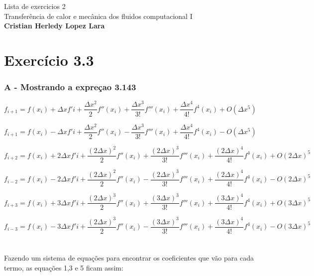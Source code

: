 \documentclass[]{article}
\title{}
\author{}
\begin{document}
\begin{center}
	{\tiny {\normalsize {\large Lista de exercicios 2 \\
Transferência de calor e mecânica dos fluidos computacional I\\
\textbf{Cristian Herledy Lopez Lara}}}}
\end{center}



\section*{Exercício 3.3}
\subsubsection*{A - Mostrando a expreçao 3.143}

\begin{equation}
	f_{i+1}=f(x_{i}) + \Delta xf'i +\frac{\Delta x^{2}}{2}f''(x_{i}) + \frac{\Delta x^{3}}{3!}f'''(x_{i}) + \frac{\Delta x^{4}}{4!}f^{4}(x_{i})+ O(\Delta x^{5})
\end{equation}

\begin{equation}
f_{i+1}=f(x_{i}) - \Delta xf'i +\frac{\Delta x^{2}}{2}f''(x_{i}) - \frac{\Delta x^{3}}{3!}f'''(x_{i}) + \frac{\Delta x^{4}}{4!}f^{4}(x_{i})- O(\Delta x^{5})
\end{equation}

\begin{equation}
	f_{i+2}=f(x_{i}) + 2\Delta xf'i +\frac{(2\Delta x)^{2}}{2}f''(x_{i}) + \frac{(2\Delta x)^{3}}{3!}f'''(x_{i}) + \frac{(2\Delta x)^{4}}{4!}f^{4}(x_{i})+ O(2\Delta x)^{5}
\end{equation}

\begin{equation}
	f_{i-2}=f(x_{i}) - 2\Delta xf'i +\frac{(2\Delta x)^{2}}{2}f''(x_{i}) - \frac{(2\Delta x)^{3}}{3!}f'''(x_{i}) + \frac{(2\Delta x)^{4}}{4!}f^{4}(x_{i})- O(2\Delta x)^{5}
\end{equation}

\begin{equation}
	f_{i+3}=f(x_{i}) + 3\Delta xf'i +\frac{(2\Delta x)^{3}}{2}f''(x_{i}) + \frac{(3\Delta x)^{3}}{3!}f'''(x_{i}) + \frac{(3\Delta x)^{4}}{4!}f^{4}(x_{i})+ O(3\Delta x)^{5}
\end{equation}

\begin{equation}
	f_{i-3}=f(x_{i}) - 3\Delta xf'i +\frac{(2\Delta x)^{3}}{2}f''(x_{i}) - \frac{(3\Delta x)^{3}}{3!}f'''(x_{i}) + \frac{(3\Delta x)^{4}}{4!}f^{4}(x_{i}) - O(3\Delta x)^{5}
\end{equation}\\
\\
Fazendo um sistema de equações para encontrar os coeficientes que vão para cada termo, as equações 1,3 e 5 ficam assim:
\end{document}
